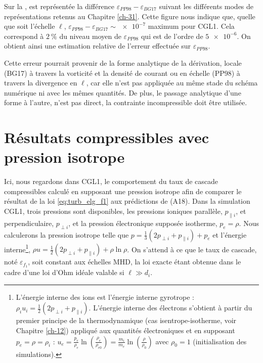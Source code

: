 Sur la  , est représentée la différence $\varepsilon_{PP98}-\varepsilon_{BG17}$ suivant les différents modes de représentations retenus au Chapitre \ref{ch-31}. Cette figure nous indique que, quelle que soit l'échelle $\boldsymbol{\ell}$, $\varepsilon_{PP98}-\varepsilon_{BG17}\sim \num{e-7}$ maximum pour CGL1. Cela correspond à $\SI{2}{\%}$ du niveau moyen de $\varepsilon_{PP98}$ qui est de l'ordre de $\num{5e-6}$. On obtient ainsi une estimation relative de l'erreur effectuée sur $\varepsilon_{PP98}$. 

Cette erreur pourrait provenir de la forme analytique de la dérivation, locale (BG17) à travers la vorticité  et la densité de courant ou en échelle (PP98) à travers la divergence en $\ell$, car elle n'est pas appliquée au même stade du schéma numérique ni avec les mêmes quantités. De plus, le passage analytique d'une forme à l'autre, n'est pas direct, la contrainte incompressible doit être utilisée. 

\section{Résultats compressibles avec pression isotrope }
\label{an:compa_predict}

Ici, nous regardons dans CGL1, le comportement du taux de cascade compressibles calculé en supposant une pression isotrope afin de comparer le résultat de la loi \eqref{eq:turb_elg_f1} aux prédictions de \cite{andres_energy_2018} (A18). Dans la simulation CGL1, trois pressions sont disponibles, les pressions ioniques parallèle, $p_{\parallel i}$, et perpendiculaire, $p_{\perp i}$, et la pression électronique supposée isotherme, $p_{e} = \rho$. Nous calculerons la pression isotrope telle que $p = \frac{1}{3}\left(2p_{\perp i} + p_{\parallel i}\right) + p_{e}$ et l'énergie interne\footnote{ 
L'énergie interne des ions est l'énergie interne gyrotrope : $\rho_i u_i = \frac{1}{2}\left(2p_{\perp i} + p_{\parallel i}\right)$. L'énergie interne des électrons s'obtient à partir du premier principe de la thermodynamique (cas isentrope-isotherme, voir Chapitre \ref{ch-12}) appliqué aux quantités électroniques et en supposant $p_e = \rho = \rho_i$ : $ u_e  = \frac{p_e}{\rho_e} \ln \left( \frac{\rho_e}{\rho_{e0}}\right) =   \frac{m_i}{m_e} \ln \left( \frac{\rho}{\rho_{0}}\right) $ avec $\rho_0 = 1$ (initialisation des simulations).}, 
$\rho u = \frac{1}{2}\left(2p_{\perp i} + p_{\parallel i}\right) + \rho \ln \rho$.
On s'attend à ce que le taux de cascade, noté $\varepsilon_{f_1}$, soit constant aux échelles MHD, la loi exacte étant obtenue dans le cadre d'une loi d'Ohm idéale valable si $\ell \gg d_i$. 

